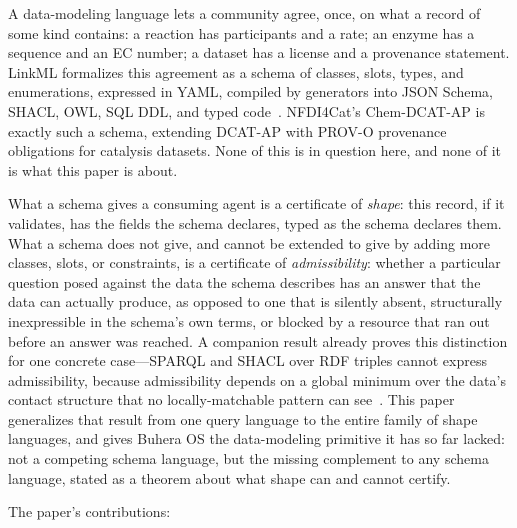 \documentclass[11pt,a4paper,twocolumn]{article}
\theoremstyle{definition}
\theoremstyle{remark}
\begin{document}
A data-modeling language lets a community agree, once, on what a record of some
kind contains: a reaction has participants and a rate; an enzyme has a sequence
and an EC number; a dataset has a license and a provenance statement. LinkML
formalizes this agreement as a schema of classes, slots, types, and enumerations,
expressed in YAML, compiled by generators into JSON Schema, SHACL, OWL, SQL DDL,
and typed code~\cite{linkml}. NFDI4Cat's Chem-DCAT-AP is exactly such a schema,
extending DCAT-AP with PROV-O provenance obligations for catalysis datasets. None
of this is in question here, and none of it is what this paper is about.

What a schema gives a consuming agent is a certificate of \emph{shape}: this
record, if it validates, has the fields the schema declares, typed as the schema
declares them. What a schema does not give, and cannot be extended to give by
adding more classes, slots, or constraints, is a certificate of
\emph{admissibility}: whether a particular question posed against the data the
schema describes has an answer that the data can actually produce, as opposed to
one that is silently absent, structurally inexpressible in the schema's own
terms, or blocked by a resource that ran out before an answer was reached. A
companion result already proves this distinction for one concrete
case---SPARQL and SHACL over RDF triples cannot express admissibility, because
admissibility depends on a global minimum over the data's contact structure that
no locally-matchable pattern can see~\cite{ladder}. This paper generalizes that
result from one query language to the entire family of shape languages, and gives
Buhera OS the data-modeling primitive it has so far lacked: not a competing
schema language, but the missing complement to any schema language, stated as a
theorem about what shape can and cannot certify.

The paper's contributions:
\end{document}
